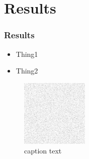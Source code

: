 \section{Results}

\begin{frame}
	\frametitle{Results}
	\begin{itemize}
		\item Thing1
		\item Thing2
	\end{itemize}
	\begin{figure}[h]
		\includegraphics[height=0.5\textheight]{images/img.png}
		\caption{caption text}
	\end{figure}
\end{frame}
